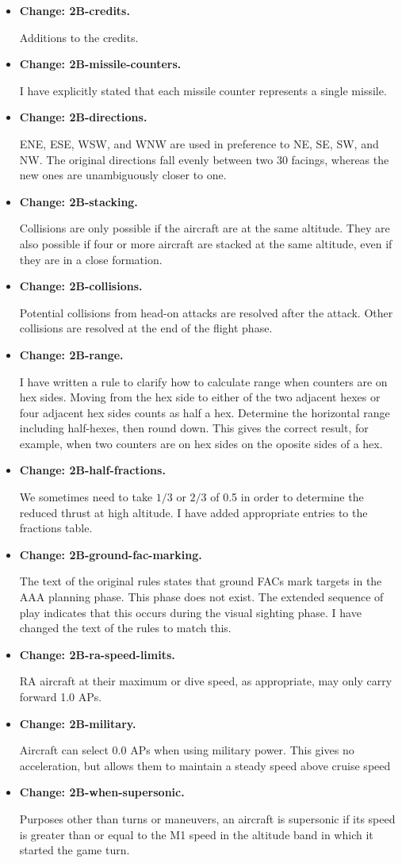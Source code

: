 \documentclass[10pt]{article}
\newcommand{\itemtag}[1]{\item \textbf{Change: #1.}\par}
\begin{document}
\begin{itemize}
    \itemtag{2B-credits} Additions to the credits.
    
    \itemtag{2B-missile-counters} I have explicitly stated that each missile counter represents a single missile.

    \itemtag{2B-directions} ENE, ESE, WSW, and WNW are used in preference to NE, SE, SW, and NW. The original directions fall evenly between two 30{\deg} facings, whereas the new  ones are unambiguously closer to one.

    \itemtag{2B-stacking} Collisions are only possible if the aircraft are at the same altitude. They are also possible if four or more aircraft are stacked at the same altitude, even if they are in a close formation.

    \itemtag{2B-collisions} Potential collisions from head-on attacks are resolved after the attack. Other collisions are resolved at the end of the flight phase.

    \itemtag{2B-range} I have written a rule to clarify how to calculate range when counters are on hex sides. Moving from the hex side to either of the two adjacent hexes or four adjacent hex sides counts as half a hex. Determine the horizontal range including half-hexes, then round down. This gives the correct result, for example, when two counters are on hex sides on the oposite sides of a hex.

    \itemtag{2B-half-fractions} We sometimes need to take $1/3$ or $2/3$ of 0.5 in order to determine the reduced thrust at high altitude. I have added appropriate entries to the fractions table.

    \itemtag{2B-ground-fac-marking} The text of the original rules states that ground FACs mark targets in the AAA planning phase. This phase does not exist. The extended sequence of play indicates that this occurs during the visual sighting phase. I have changed the text of the rules to match this.

    \itemtag{2B-ra-speed-limits} RA aircraft at their maximum or dive speed, as appropriate, may only carry forward 1.0 APs.

    \itemtag{2B-military} Aircraft can select 0.0 APs when using military power. This gives no acceleration, but allows them to maintain a steady speed above cruise speed
    
    \itemtag{2B-when-supersonic} Purposes other than turns or maneuvers, an aircraft is supersonic if its speed is greater than or equal to the M1 speed in the altitude band in which it started the game turn.


\end{itemize}
\end{document}

